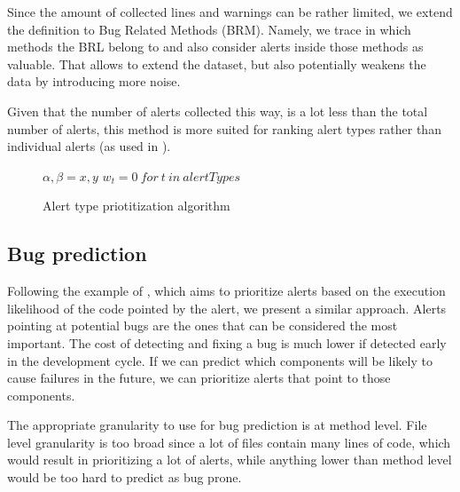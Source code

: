
Since the amount of collected lines and warnings can be rather limited, we extend the definition to Bug Related Methods (BRM). Namely, we trace in which methods the BRL belong to and also consider alerts inside those methods as valuable. That allows to extend the dataset, but also potentially weakens the data by introducing more noise.

Given that the number of alerts collected this way, is a lot less than the total number of alerts, this method is more suited for ranking alert types rather than individual alerts (as used in \cite{which_warnings}).

\begin{figure}[ht]
	\centering
	\begin{minipage}{.5\linewidth}
		\begin{algorithm}[H]
			\SetAlgoLined
			$\alpha, \beta = x, y$\;
			$w_t = 0 \ for \ t \ in \ alertTypes$\;
			\caption{Alert type priotitization algorithm}
		\end{algorithm}
	\end{minipage}
\end{figure}

\subsection{Bug prediction}

Following the example of \cite{static_profiling}, which aims to prioritize alerts based on the execution likelihood of the code pointed by the alert, we present a similar approach. Alerts pointing at potential bugs are the ones that can be considered the most important. The cost of detecting and fixing a bug is much lower if detected early in the development cycle. If we can predict which components will be likely to cause failures in the future, we can prioritize alerts that point to those components. 

The appropriate granularity to use for bug prediction is at method level. File level granularity is too broad since a lot of files contain many lines of code, which would result in prioritizing a lot of alerts, while anything lower than method level would be too hard to predict as bug prone.

